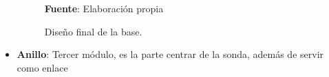 \begin{itemize}
    \begin{figure}[ht]
    \centering
    \caption{Dise\~no final de la base.}{ \textbf{Fuente}: Elaboraci\'on propia}
    \label{fig:Base2020}
    \end{figure}
    \item \textbf{Anillo}: Tercer
    m\'odulo, es la parte centrar de la sonda, adem\'as de servir como enlace 

\end{itemize}
